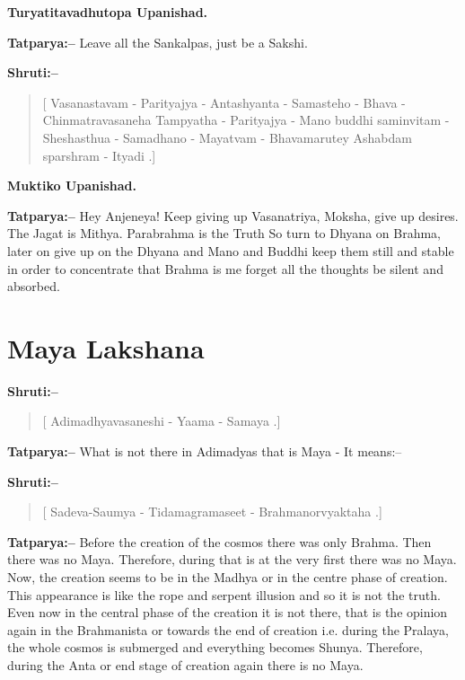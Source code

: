 \begin{flushright}
\textbf{Turyatitavadhutopa Upanishad.}
\end{flushright}

\textbf{Tatparya:–} Leave all the Sankalpas, just be a Sakshi.

\newpage

\textbf{Shruti:–}

\begin{verse}
[ Vasanastavam - Parityajya - Antashyanta - Samasteho - Bhava - Chinmatravasaneha  Tampyatha - Parityajya - Mano buddhi saminvitam - Sheshasthua - Samadhano - Mayatvam - Bhavamarutey  Ashabdam sparshram - Ityadi .]
\end{verse}

\begin{flushright}
\textbf{Muktiko Upanishad.}
\end{flushright}

\textbf{Tatparya:–} Hey Anjeneya! Keep giving up Vasanatriya, Moksha, give up desires. The Jagat is Mithya. Parabrahma is the Truth So turn to Dhyana on Brahma, later on give up on the Dhyana and Mano and Buddhi keep them still and stable in order to concentrate that Brahma is me forget all the thoughts be silent and absorbed.

\chapter{Maya Lakshana}

\textbf{Shruti:–}

\begin{verse}
[ Adimadhyavasaneshi - Yaama - Samaya .]
\end{verse}

\textbf{Tatparya:–} What is not there in Adimadyas that is Maya - It means:–

\textbf{Shruti:–}

\begin{verse}
[ Sadeva-Saumya - Tidamagramaseet - Brahmanorvyaktaha .]
\end{verse}

\textbf{Tatparya:–} Before the creation of the cosmos there was only Brahma. Then there was no Maya. Therefore, during that is at the very first there was no Maya. Now, the creation seems to be in the Madhya or in the centre phase of creation. This appearance is like the rope and serpent illusion and so it is not the truth. Even now in the central phase of the creation it is not there, that is the opinion again in the Brahmanista or towards the end of creation i.e. during the Pralaya, the whole cosmos is submerged and everything becomes Shunya. Therefore, during the Anta or end stage of creation again there is no Maya.

